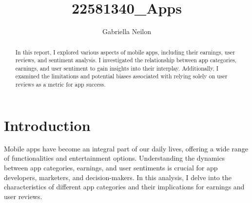\documentclass[11pt,preprint, authoryear]{elsarticle}
\numberwithin{equation}{section}
\numberwithin{figure}{section}
\numberwithin{table}{section}
\begin{document}
\begin{frontmatter}  %

\title{22581340\_Apps}





\author[Add1]{Gabriella Neilon}





\address[Add1]{Stellenbosch University}


\begin{abstract}
\small{
In this report, I explored various aspects of mobile apps, including
their earnings, user reviews, and sentiment analysis. I investigated the
relationship between app categories, earnings, and user sentiment to
gain insights into their interplay. Additionally, I examined the
limitations and potential biases associated with relying solely on user
reviews as a metric for app success.
}
\end{abstract}

\vspace{1cm}





\vspace{0.5cm}

\end{frontmatter}

\setcounter{footnote}{0}



\pagestyle{fancy}
\chead{}
\rhead{}
\lfoot{}
\lhead{}
\cfoot{}


\headsep 35pt %




\hypertarget{introduction}{%
\section{\texorpdfstring{Introduction
\label{Introduction}}{Introduction }}\label{introduction}}

Mobile apps have become an integral part of our daily lives, offering a
wide range of functionalities and entertainment options. Understanding
the dynamics between app categories, earnings, and user sentiments is
crucial for app developers, marketers, and decision-makers. In this
analysis, I delve into the characteristics of different app categories
and their implications for earnings and user reviews.
\end{document}

